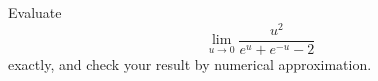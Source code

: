 Evaluate
\begin{equation*}
  \lim_{u\rightarrow 0} \frac{u^2}{e^u+e^{-u}-2}
\end{equation*}
exactly, and check your result by numerical approximation.

